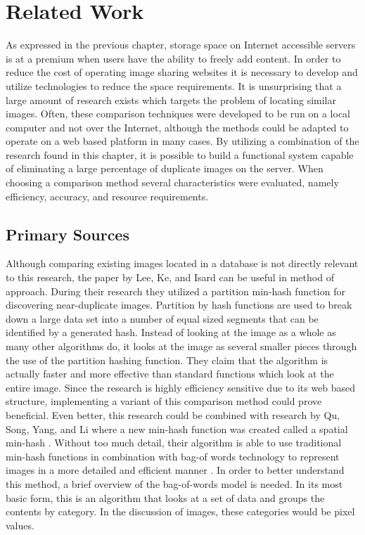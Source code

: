 %
%
\chapter{Related Work}\label{ch:relatedwork}

As expressed in the previous chapter, storage space on Internet accessible servers is at a premium when users have the ability to freely add content. In order to reduce the cost of operating image sharing websites it is necessary to develop and utilize technologies to reduce the space requirements. It is unsurprising that a large amount of research exists which targets the problem of locating similar images. Often, these comparison techniques were developed to be run on a local computer and not over the Internet, although the methods could be adapted to operate on a web based platform in many cases. By utilizing a combination of the research found in this chapter, it is possible to build a functional system capable of eliminating a large percentage of duplicate images on the server. When choosing a comparison method several characteristics were evaluated, namely efficiency, accuracy, and resource requirements.

\section{Primary Sources}
Although comparing existing images located in a database is not directly relevant to this research, the paper by Lee, Ke, and Isard \cite{Lee:2010} can be useful in method of approach. During their research they utilized a partition min-hash function for discovering near-duplicate images. Partition by hash functions are used to break down a large data set into a number of equal sized segments that can be identified by a generated hash. Instead of looking at the image as a whole as many other algorithms do, it looks at the image as several smaller pieces through the use of the partition hashing function. They claim that the algorithm is actually faster and more effective than standard functions which look at the entire image. Since the research is highly efficiency sensitive due to its web based structure, implementing a variant of this comparison method could prove beneficial. Even better, this research could be combined with research by Qu, Song, Yang, and Li where a new min-hash function was created called a spatial min-hash \cite{ZhangYinZhou}. Without too much detail, their algorithm is able to use traditional min-hash functions in combination with bag-of words technology to represent images in a more detailed and efficient manner \cite{Qu:2013:SMS:2499788.2499863}. In order to better understand this method, a brief overview of the bag-of-words model is needed. In its most basic form, this is an algorithm that looks at a set of data and groups the contents by category. In the discussion of images, these categories would be pixel values.

